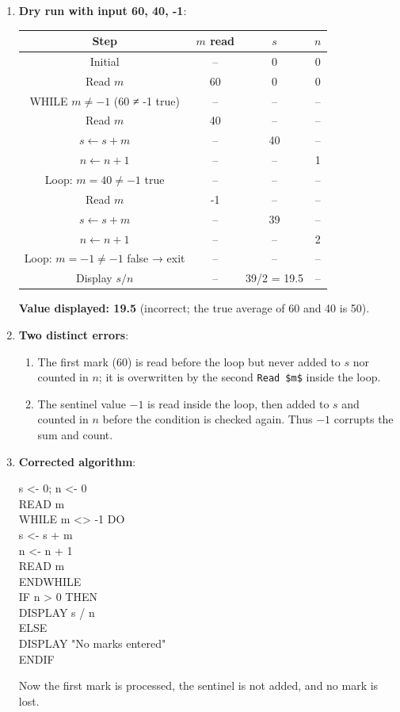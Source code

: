 \documentclass[11pt]{article}
\begin{document}
\begin{corrige}
\begin{enumerate}
\item \textbf{Dry run with input 60, 40, -1}:
\begin{center}
\begin{tabular}{|c|c|c|c|}
\hline
Step & $m$ read & $s$ & $n$ \\
\hline
Initial & – & 0 & 0 \\
Read $m$ & 60 & 0 & 0 \\
WHILE $m \neq -1$ (60 ≠ -1 true) & – & – & – \\
Read $m$ & 40 & – & – \\
$s \leftarrow s+m$ & – & 40 & – \\
$n \leftarrow n+1$ & – & – & 1 \\
Loop: $m=40 \neq -1$ true & – & – & – \\
Read $m$ & -1 & – & – \\
$s \leftarrow s+m$ & – & 39 & – \\
$n \leftarrow n+1$ & – & – & 2 \\
Loop: $m=-1 \neq -1$ false → exit & – & – & – \\
Display $s/n$ & – & 39/2 = 19.5 & – \\
\hline
\end{tabular}
\end{center}
\textbf{Value displayed: 19.5} (incorrect; the true average of 60 and 40 is 50).
\item \textbf{Two distinct errors}:
\begin{enumerate}
\item The first mark (60) is read before the loop but never added to $s$ nor counted in $n$; it is overwritten by the second \texttt{Read \$m\$} inside the loop.
\item The sentinel value $-1$ is read inside the loop, then added to $s$ and counted in $n$ before the condition is checked again. Thus $-1$ corrupts the sum and count.
\end{enumerate}
\item \textbf{Corrected algorithm}:
\begin{flushleft}\ttfamily\small
s <- 0; n <- 0\\
READ m\\
WHILE m <> -1 DO\\
\quad s <- s + m\\
\quad n <- n + 1\\
\quad READ m\\
ENDWHILE\\
IF n > 0 THEN\\
\quad DISPLAY s / n\\
ELSE\\
\quad DISPLAY "No marks entered"\\
ENDIF
\end{flushleft}
Now the first mark is processed, the sentinel is not added, and no mark is lost.
\end{enumerate}
\end{corrige}
\end{document}
